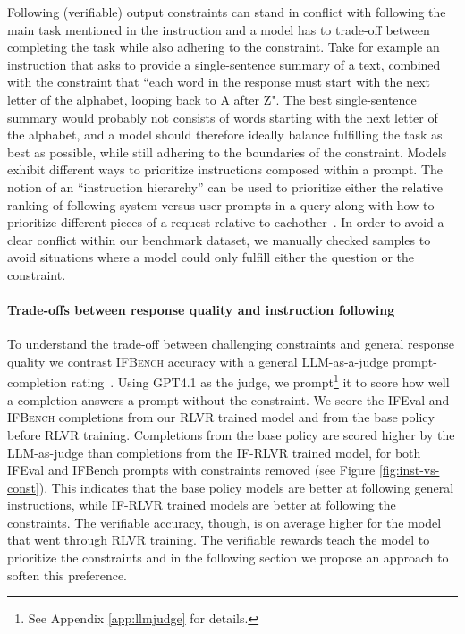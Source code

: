 \documentclass{article}
\newcommand{\benchname}{\textsc{IFBench}\xspace}
\begin{document}
Following (verifiable) output constraints can stand in conflict with following the main task mentioned in the instruction and a model has to trade-off between completing the task while also adhering to the constraint. 
Take for example an instruction that asks to provide a single-sentence summary of a text, combined with the constraint that ``each word in the response must start with the next letter of the alphabet, looping back to A after Z". 
The best single-sentence summary would probably not consists of words starting with the next letter of the alphabet, and a model should therefore ideally balance fulfilling the task as best as possible, while still adhering to the boundaries of the constraint. 
Models exhibit different ways to prioritize instructions composed within a prompt. 
The notion of an ``instruction hierarchy'' can be used to prioritize either the relative ranking of following system versus user prompts in a query along with how to prioritize different pieces of a request relative to eachother~\cite{wallace2024instruction}. 
In order to avoid a clear conflict within our benchmark dataset, we manually checked samples to avoid situations where a model could only fulfill either the question or the constraint. 

\paragraph{Trade-offs between response quality and instruction following}
To understand the trade-off between challenging constraints and general response quality we contrast \benchname accuracy with a general LLM-as-a-judge prompt-completion rating~\citep{zheng2023judging}.
Using GPT4.1 as the judge, we prompt\footnote{See Appendix \ref{app:llmjudge} for details.} it to score how well a completion answers a prompt without the constraint. 
We score the IFEval and \benchname completions from our RLVR trained model and from the base policy before RLVR training. 
Completions from the base policy are scored higher by the LLM-as-judge than completions from the IF-RLVR trained model, for both IFEval and IFBench prompts with constraints removed (see Figure \ref{fig:inst-vs-const}). This indicates that the base policy models are better at following general instructions, while IF-RLVR trained models are better at following the constraints.
The verifiable accuracy, though, is on average higher for the model that went through RLVR training. 
The verifiable rewards teach the model to prioritize the constraints and in the following section we propose an approach to soften this preference.
\end{document}
